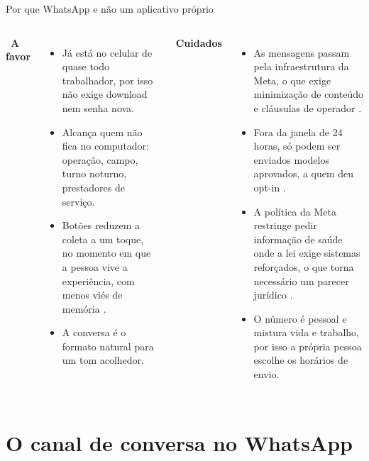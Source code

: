 \documentclass[aspectratio=169,10pt]{beamer}
\begin{document}
\begin{frame}{Por que WhatsApp e não um aplicativo próprio}
\begin{columns}[T,onlytextwidth]
\textcolor{menta}{\faThumbsUp}\ \textbf{A favor}
\begin{itemize}\footnotesize
  \item Já está no celular de quase todo trabalhador, por isso não exige
    download nem senha nova.
  \item Alcança quem não fica no computador: operação, campo, turno
    noturno, prestadores de serviço.
  \item Botões reduzem a coleta a um toque, no momento em que a pessoa
    vive a experiência, com menos viés de memória \parencite{shiffman2008}.
  \item A conversa é o formato natural para um tom acolhedor.
\end{itemize}
\textcolor{coral}{\faExclamationTriangle}\ \textbf{Cuidados}
\begin{itemize}\footnotesize
  \item As mensagens passam pela infraestrutura da Meta, o que exige
    minimização de conteúdo e cláusulas de operador
    \parencite{lgpd2018}.
  \item Fora da janela de 24 horas, só podem ser enviados modelos
    aprovados, a quem deu opt-in
    \parencite{meta_servicewindow,meta_optin}.
  \item A política da Meta restringe pedir informação de saúde onde a lei
    exige sistemas reforçados, o que torna necessário um parecer jurídico \parencite{whatsapp_policy}.
  \item O número é pessoal e mistura vida e trabalho, por isso a própria
    pessoa escolhe os horários de envio.
\end{itemize}
\end{columns}
\end{frame}

\section{O canal de conversa no WhatsApp}
\end{document}

